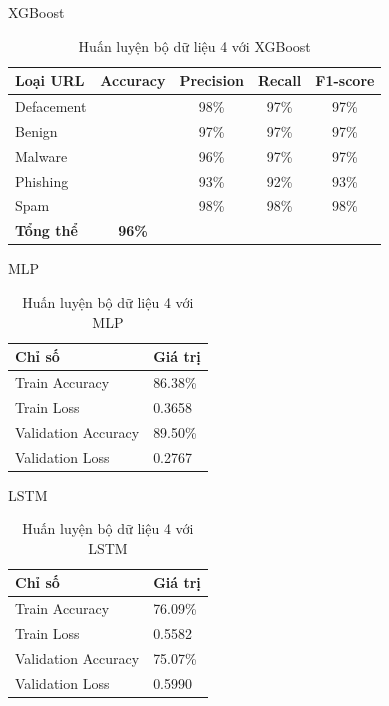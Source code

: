 \documentclass[13pt]{article}
\begin{document}
XGBoost
\begin{table}[h]
    \centering
    \renewcommand{\arraystretch}{1.3} %
    \begin{tabular}{|l|c|c|c|c|}
        \hline
        \rowcolor[HTML]{C0C0C0} %
        \textbf{Loại URL} & \textbf{Accuracy} & \textbf{Precision} & \textbf{Recall} & \textbf{F1-score} \\ 
        \hline
        Defacement &  & 98\% & 97\% & 97\% \\ 
        \hline
        Benign &  & 97\% & 97\% & 97\% \\ 
        \hline
        Malware &  & 96\% & 97\% & 97\% \\ 
        \hline
        Phishing &  & 93\% & 92\% & 93\% \\ 
        \hline
        Spam &  & 98\% & 98\% & 98\% \\ 
        \hline
        \textbf{Tổng thể} & \textbf{96\%} &  &  &  \\ 
        \hline
    \end{tabular}
    \caption{Huấn luyện bộ dữ liệu 4 với XGBoost}
    \label{tab:logistic_regression}
\end{table}

MLP
\begin{table}[h]
    \centering
    \renewcommand{\arraystretch}{1.4} %
    \begin{tabular}{|p{5cm}|p{3cm}|}
        \hline
        \rowcolor[HTML]{C0C0C0} %
        \textbf{Chỉ số} & \textbf{Giá trị} \\ 
        \hline
        Train Accuracy & 86.38\% \\ 
        \hline
        Train Loss & 0.3658 \\ 
        \hline
        Validation Accuracy & 89.50\% \\ 
        \hline
        Validation Loss & 0.2767 \\ 
        \hline
    \end{tabular}
    \caption{Huấn luyện bộ dữ liệu 4 với MLP}
    \label{tab:mlp_training}
\end{table}

LSTM
\newpage
\begin{table}[h]
    \centering
    \renewcommand{\arraystretch}{1.4} %
    \begin{tabular}{|p{5cm}|p{3cm}|}
        \hline
        \rowcolor[HTML]{C0C0C0} %
        \textbf{Chỉ số} & \textbf{Giá trị} \\ 
        \hline
        Train Accuracy & 76.09\% \\ 
        \hline
        Train Loss & 0.5582 \\ 
        \hline
        Validation Accuracy & 75.07\% \\ 
        \hline
        Validation Loss & 0.5990 \\ 
        \hline
    \end{tabular}
    \caption{Huấn luyện bộ dữ liệu 4 với LSTM}
    \label{tab:mlp_training}
\end{table}
\end{document}
